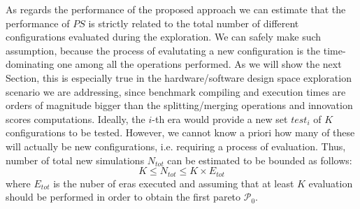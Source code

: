 As regards the performance of the proposed approach we can estimate that the
performance of $PS$ is strictly related to the total number of
different configurations evaluated during the exploration. We can
safely make such assumption, because the process of evalutating a new
configuration is the time-dominating one among all the operations
performed. As we will show the
next Section, this is especially true in the hardware/software
design space exploration scenario we are addressing, since benchmark compiling and execution times
are orders of magnitude bigger than the splitting/merging operations and
innovation scores computations.  Ideally, the $i$-th era would provide a new set
$test_i$ of $K$ configurations to be tested. However, we cannot know
a priori how many of
these will actually be new configurations, i.e. requiring a process of
evaluation. Thus, number of total new simulations $N_{tot}$ 
can be estimated to be bounded as follows:
\[
K \le N_{tot} \le K \times E_{tot}
\]
where $E_{tot}$ is the nuber of eras executed and assuming that at
least $K$ evaluation should be performed in order to obtain the first
pareto $\mathscr{P}_0$. 
